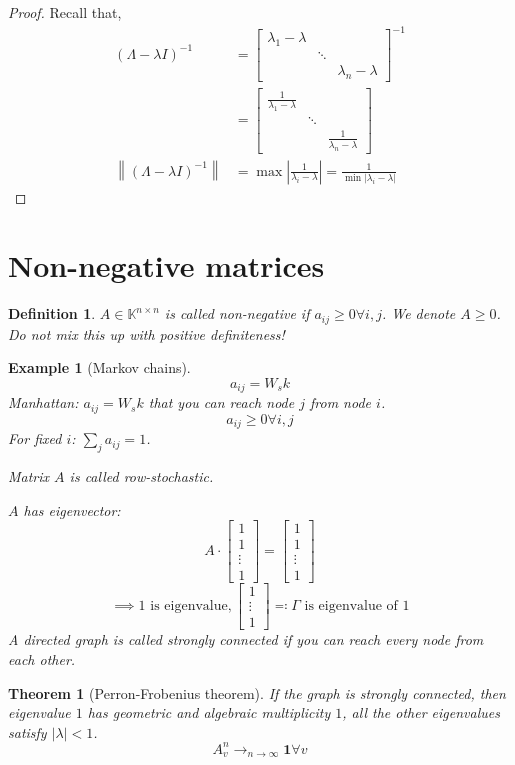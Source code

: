 \documentclass{article}
\newtheorem{theorem}{Theorem}  \numberwithin{theorem}{section}
\newtheorem{example}{Example}  \numberwithin{example}{section}
\newtheorem{definition}{Definition}  \numberwithin{definition}{section}
\newcommand{\norm}[1]{\left\|#1\right\|}
\newcommand{\card}[1]{\left|#1\right|}
\begin{document}
\begin{proof}
  Recall that,
  \begin{align*}
    (\Lambda - \lambda I)^{-1}
      &= \begin{bmatrix} \lambda_1 - \lambda & & \\ & \ddots & \\ & & \lambda_n - \lambda \end{bmatrix}^{-1} \\
      &= \begin{bmatrix} \frac{1}{\lambda_1 - \lambda} & & \\ & \ddots & \\ & & \frac{1}{\lambda_n - \lambda} \end{bmatrix} \\
    \norm{(\Lambda - \lambda I)^{-1}} &= \max\card{\frac{1}{\lambda_i - \lambda}} = \frac{1}{\min\card{\lambda_i - \lambda}}
  \end{align*}
\end{proof}

\section{Non-negative matrices}

\begin{definition} %
  $A \in \mathbb K^{n \times n}$ is called \emph{non-negative}
  if $a_{ij} \geq 0 \forall i,j$. We denote $A \geq 0$.
  Do not mix this up with positive definiteness!
\end{definition}

\begin{example}[Markov chains]
  \[ a_{ij} = W_s k \]
  Manhattan: $a_{ij} = W_s k$ that you can reach node $j$ from node $i$.
  \[ a_{ij} \geq 0 \forall i,j \]
  For fixed $i$: $\sum_j a_{ij} = 1$.

  Matrix $A$ is called \emph{row-stochastic}.

  $A$ has eigenvector:
  \[ A \cdot \begin{bmatrix} 1 \\ 1 \\ \vdots \\ 1 \end{bmatrix} = \begin{bmatrix} 1 \\ 1 \\ \vdots \\ 1 \end{bmatrix} \]
  \[ \implies 1 \text{ is eigenvalue}, \begin{bmatrix} 1 \\ \vdots \\ 1 \end{bmatrix} \eqqcolon \Gamma \text{ is eigenvalue of } 1 \]
  A directed graph is called \emph{strongly connected} if you can reach every node from each other.
\end{example}

\begin{theorem}[Perron-Frobenius theorem]
  If the graph is strongly connected, then eigenvalue $1$ has geometric and algebraic multiplicity $1$,
  all the other eigenvalues satisfy $\card{\lambda} < 1$.
  \[ A_v^n \to_{n \to \infty} \mathbf 1 \forall v \]
\end{theorem}

\printindex
\end{document}
